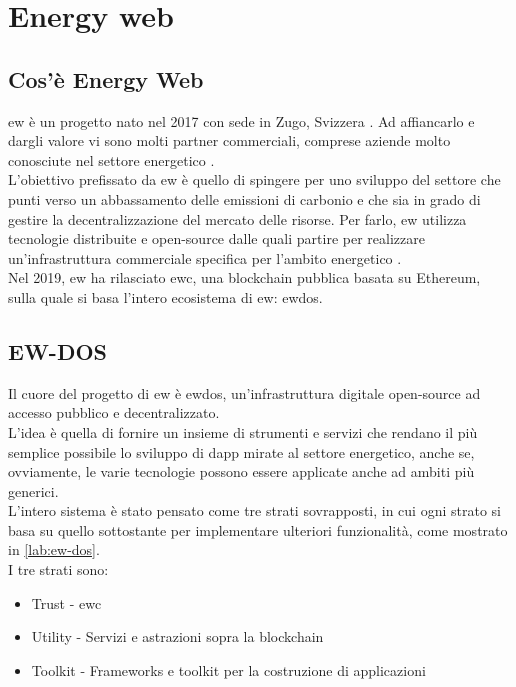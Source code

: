 \chapter{Energy web}

\section{Cos'è Energy Web}
\gls{ew} è un progetto nato nel 2017 con sede in Zugo, Svizzera \cite{wiki:ew-history}. 
Ad affiancarlo e dargli valore vi sono molti partner commerciali, comprese aziende molto conosciute nel settore energetico \cite{wiki:ew-affiliate}. \\
L'obiettivo prefissato da \gls{ew} è quello di spingere per uno sviluppo del settore che punti verso un abbassamento delle emissioni di carbonio e che sia in grado di gestire la decentralizzazione del mercato delle risorse.
Per farlo, \gls{ew} utilizza tecnologie distribuite e open-source dalle quali partire per realizzare un'infrastruttura commerciale specifica per l'ambito energetico \cite{wiki:ew-about}. \\
Nel 2019, \gls{ew} ha rilasciato \gls{ewc}, una blockchain pubblica basata su Ethereum, sulla quale si basa l'intero ecosistema di \gls{ew}: \gls{ewdos}.

\section{EW-DOS}
Il cuore del progetto di \gls{ew} è \gls{ewdos}, un'infrastruttura digitale open-source ad accesso pubblico e decentralizzato. \\
L'idea è quella di fornire un insieme di strumenti e servizi che rendano il più semplice possibile lo sviluppo di \gls{dapp} mirate al settore energetico, 
anche se, ovviamente, le varie tecnologie possono essere applicate anche ad ambiti più generici. \\
L'intero sistema è stato pensato come tre strati sovrapposti, in cui ogni strato si basa su quello sottostante per implementare ulteriori funzionalità, come mostrato in \autoref{lab:ew-dos}. \\

I tre strati sono:
\begin{itemize}
    \item Trust - \gls{ewc}
    \item Utility - Servizi e astrazioni sopra la blockchain
    \item Toolkit - Frameworks e toolkit per la costruzione di applicazioni
\end{itemize}

